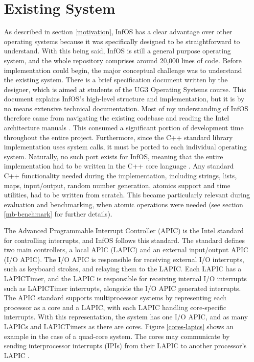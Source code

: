 \documentclass[bsc,frontabs,singlespacing,parskip,deptreport]{infthesis}
\begin{document}
\section{Existing System} \label{existing-system}
As described in section \ref{motivation}, InfOS has a clear advantage over other operating systems because it was specifically designed to be straightforward to understand. With this being said, InfOS is still a general purpose operating system, and the whole repository comprises around 20,000 lines of code. Before implementation could begin, the major conceptual challenge was to understand the existing system. There is a brief specification document \cite{os-cw-spec} written by the designer, which is aimed at students of the UG3 Operating Systems course. This document explains InfOS’s high-level structure and implementation, but it is by no means extensive technical documentation. Most of my understanding of InfOS therefore came from navigating the existing codebase and reading the Intel architecture manuals \cite{intel-full-manual}. This consumed a significant portion of development time throughout the entire project. Furthermore, since the C++ standard library implementation uses system calls, it must be ported to each individual operating system. Naturally, no such port exists for InfOS, meaning that the entire implementation had to be written in the C++ core language \cite{cpp-core}. Any standard C++ functionality needed during the implementation, including strings, lists, maps, input/output, random number generation, atomics support and time utilities, had to be written from scratch. This became particularly relevant during evaluation and benchmarking, when atomic operations were needed (see section \ref{mb-benchmark} for further details).
 
The Advanced Programmable Interrupt Controller (APIC) \cite{intel-sys-prog-guide} is the Intel standard for controlling interrupts, and InfOS follows this standard. The standard defines two main controllers, a local APIC (LAPIC) and an external input/output APIC (I/O APIC). The I/O APIC is responsible for receiving external I/O interrupts, such as keyboard strokes, and relaying them to the LAPIC. Each LAPIC has a LAPICTimer, and the LAPIC is responsible for receiving internal I/O interrupts such as LAPICTimer interrupts, alongside the I/O APIC generated interrupts. The APIC standard supports multiprocessor systems by representing each processor as a core and a LAPIC, with each LAPIC handling core-specific interrupts. With this representation, the system has one I/O APIC, and as many LAPICs and LAPICTimers as there are cores. Figure \ref{cores-lapics} shows an example in the case of a quad-core system. The cores may communicate by sending interprocessor interrupts (IPIs) from their LAPIC to another processor’s LAPIC \cite{intel-sys-prog-guide}. 
\end{document}
